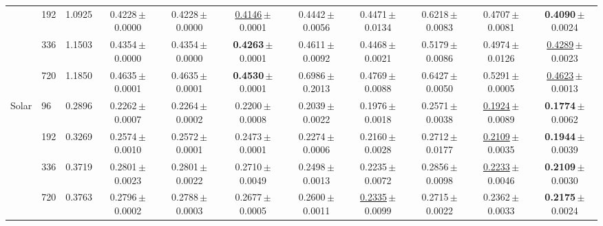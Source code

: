 \begin{tabular}{llccccccccc}
 & 192 & 1.0925 & 0.4228\,{\tiny$\pm$0.0000} & 0.4228\,{\tiny$\pm$0.0000} & \underline{0.4146}\,{\tiny$\pm$0.0001} & 0.4442\,{\tiny$\pm$0.0056} & 0.4471\,{\tiny$\pm$0.0134} & 0.6218\,{\tiny$\pm$0.0083} & 0.4707\,{\tiny$\pm$0.0081} & \textbf{0.4090}\,{\tiny$\pm$0.0024} \\
 & 336 & 1.1503 & 0.4354\,{\tiny$\pm$0.0000} & 0.4354\,{\tiny$\pm$0.0000} & \textbf{0.4263}\,{\tiny$\pm$0.0001} & 0.4611\,{\tiny$\pm$0.0092} & 0.4468\,{\tiny$\pm$0.0021} & 0.5179\,{\tiny$\pm$0.0086} & 0.4974\,{\tiny$\pm$0.0126} & \underline{0.4289}\,{\tiny$\pm$0.0023} \\
 & 720 & 1.1850 & 0.4635\,{\tiny$\pm$0.0001} & 0.4635\,{\tiny$\pm$0.0001} & \textbf{0.4530}\,{\tiny$\pm$0.0001} & 0.6986\,{\tiny$\pm$0.2013} & 0.4769\,{\tiny$\pm$0.0088} & 0.6427\,{\tiny$\pm$0.0050} & 0.5291\,{\tiny$\pm$0.0005} & \underline{0.4623}\,{\tiny$\pm$0.0013} \\
\midrule
\multirow{4}{*}{Solar} & 96 & 0.2896 & 0.2262\,{\tiny$\pm$0.0007} & 0.2264\,{\tiny$\pm$0.0002} & 0.2200\,{\tiny$\pm$0.0008} & 0.2039\,{\tiny$\pm$0.0022} & 0.1976\,{\tiny$\pm$0.0018} & 0.2571\,{\tiny$\pm$0.0038} & \underline{0.1924}\,{\tiny$\pm$0.0089} & \textbf{0.1774}\,{\tiny$\pm$0.0062} \\
 & 192 & 0.3269 & 0.2574\,{\tiny$\pm$0.0010} & 0.2572\,{\tiny$\pm$0.0001} & 0.2473\,{\tiny$\pm$0.0001} & 0.2274\,{\tiny$\pm$0.0006} & 0.2160\,{\tiny$\pm$0.0028} & 0.2712\,{\tiny$\pm$0.0177} & \underline{0.2109}\,{\tiny$\pm$0.0035} & \textbf{0.1944}\,{\tiny$\pm$0.0039} \\
 & 336 & 0.3719 & 0.2801\,{\tiny$\pm$0.0023} & 0.2801\,{\tiny$\pm$0.0022} & 0.2710\,{\tiny$\pm$0.0049} & 0.2498\,{\tiny$\pm$0.0013} & 0.2235\,{\tiny$\pm$0.0072} & 0.2856\,{\tiny$\pm$0.0098} & \underline{0.2233}\,{\tiny$\pm$0.0046} & \textbf{0.2109}\,{\tiny$\pm$0.0030} \\
 & 720 & 0.3763 & 0.2796\,{\tiny$\pm$0.0002} & 0.2788\,{\tiny$\pm$0.0003} & 0.2677\,{\tiny$\pm$0.0005} & 0.2600\,{\tiny$\pm$0.0011} & \underline{0.2335}\,{\tiny$\pm$0.0099} & 0.2715\,{\tiny$\pm$0.0022} & 0.2362\,{\tiny$\pm$0.0033} & \textbf{0.2175}\,{\tiny$\pm$0.0024} \\
\bottomrule
\end{tabular}
